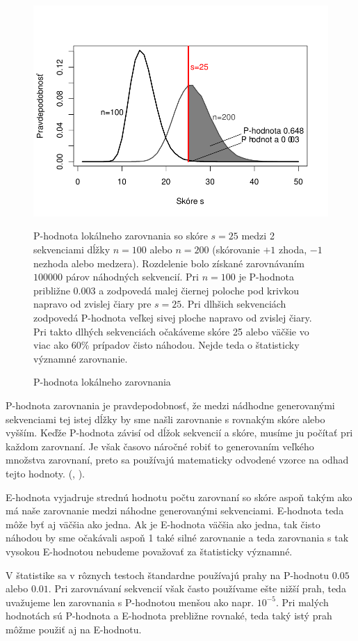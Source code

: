 \begin{figure}[htp]
    \centering
    \includegraphics[width=.9\textwidth]{images/p-value}
    \caption{P-hodnota lokálneho zarovnania}
    P-hodnota lokálneho zarovnania so skóre $s = 25$ medzi 2 sekvenciami dĺžky $n = 100$ alebo $n = 200$ (skórovanie $+1$ zhoda, $-1$ nezhoda alebo medzera). Rozdelenie bolo získané zarovnávaním $100000$ párov náhodných sekvencií. Pri $n=100$ je P-hodnota približne 0.003 a zodpovedá malej čiernej poloche pod krivkou napravo od zvislej čiary pre $s=25$. Pri dlhšich sekvenciách zodpovedá P-hodnota veľkej sivej ploche napravo od zvislej čiary. Pri takto dlhých sekvenciách očakáveme skóre 25 alebo väčšie vo viac ako 60\% prípadov čisto náhodou. Nejde teda o štatisticky významné zarovnanie.
    \label{fig:p-value}
\end{figure}

P-hodnota zarovnania je pravdepodobnosť, že medzi nádhodne generovanými sekvenciami tej istej dĺžky by sme našli zarovnanie s rovnakým skóre alebo vyšším. Keďže P-hodnota závisí od dĺžok sekvencií a skóre, musíme ju počítať pri každom zarovnaní. Je však časovo náročné robiť to generovaním veľkého množstva zarovnaní, preto sa používajú matematicky odvodené vzorce na odhad tejto hodnoty. (\cite{Karlin}, \cite{Mitrophanov}).

E-hodnota vyjadruje strednú hodnotu počtu zarovnaní so skóre aspoň takým ako má naše zarovnanie medzi náhodne generovanými sekvenciami. E-hodnota teda môže byť aj väčšia ako jedna. Ak je E-hodnota väčšia ako jedna, tak čisto náhodou by sme očakávali aspoň 1 také silné zarovnanie a teda zarovnania s tak vysokou E-hodnotou nebudeme považovať za štatisticky významné.

V štatistike sa v rôznych testoch štandardne používajú prahy na P-hodnotu $0.05$ alebo $0.01$.
Pri zarovnávaní sekvencií však často používame ešte nižší prah, teda uvažujeme len zarovnania s P-hodnotou menšou ako napr. $10^{-5}$. Pri malých hodnotách sú P-hodnota a E-hodnota prebližne rovnaké, teda taký istý prah môžme použiť aj na E-hodnotu.
